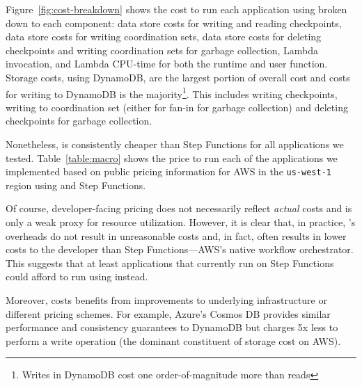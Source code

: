 Figure~\ref{fig:cost-breakdown} shows the cost to run each application using
\name{} broken down to each component: data store costs for writing and
reading checkpoints, data store costs for writing coordination sets, data
store costs for deleting checkpoints and writing coordination sets for garbage
collection, Lambda invocation, and Lambda CPU-time for both the \name{}
runtime and user function. Storage costs, using DynamoDB, are the largest
portion of overall cost and costs for writing to DynamoDB is the
majority\footnote{Writes in DynamoDB cost one order-of-magnitude more than
reads}. This includes writing checkpoints, writing to coordination set (either
for fan-in for garbage collection) and deleting checkpoints for garbage
collection.

Nonetheless, \name{} is consistently cheaper than Step Functions for all
applications we tested. Table~\ref{table:macro} shows the price to run each of
the applications we implemented based on public pricing information for AWS in
the \texttt{us-west-1} region using \name{} and Step Functions.


Of course, developer-facing pricing does not necessarily reflect \emph{actual}
costs and is only a weak proxy for resource utilization. However, it is clear
that, in practice, \name{}'s overheads do not result in unreasonable costs and,
in fact, often results in lower costs to the developer than Step
Functions---AWS's native workflow orchestrator. This suggests that at least
applications that currently run on Step Functions could afford to run using
\name{} instead.

Moreover, \name{} costs benefits from improvements to underlying infrastructure
or different pricing schemes. For example, Azure's Cosmos DB provides similar
performance and consistency guarantees to DynamoDB but charges 5x less to
perform a write operation (the dominant constituent of \name{} storage cost on
AWS).



